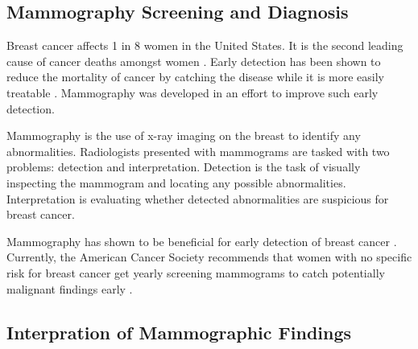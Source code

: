 \subsection{Mammography Screening and Diagnosis}
Breast cancer affects 1 in 8 women in the United States. It is the second leading cause of cancer deaths amongst women \cite{Siegel:2012kt}. Early detection has been shown to reduce the mortality of cancer by catching the disease while it is more easily treatable \cite{Baker:1982jg}. Mammography was developed in an effort to improve such early detection. 

Mammography is the use of x-ray imaging on the breast to identify any abnormalities. Radiologists presented with mammograms are tasked with two problems: detection and interpretation. Detection is the task of visually inspecting the mammogram and locating any possible abnormalities. Interpretation is evaluating whether detected abnormalities are suspicious for breast cancer.

Mammography has shown to be beneficial for early detection of breast cancer \cite{Nystrom:2002hb}. Currently, the American Cancer Society recommends that women with no specific risk for breast cancer get yearly screening mammograms to catch potentially malignant findings early \cite{Smith:2003en}.

\subsection{Interpration of Mammographic Findings}

